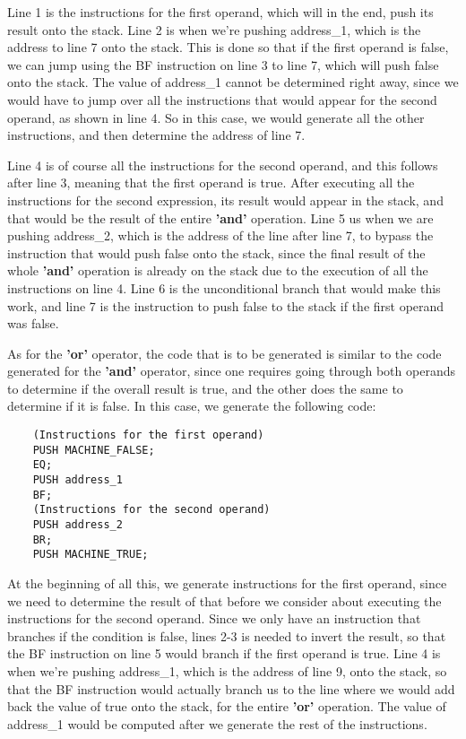 \documentclass{article}
\begin{document}
Line 1 is the instructions for the first operand, which will in the end, push its result onto the stack. Line 2 is when we're pushing address\_1, which is the address to line 7 onto the stack. This is done so that if the first operand is false, we can jump using the BF instruction on line 3 to line 7, which will push false onto the stack. The value of address\_1 cannot be determined right away, since we would have to jump over all the instructions that would appear for the second operand, as shown in line 4. So in this case, we would generate all the other instructions, and then determine the address of line 7.

Line 4 is of course all the instructions for the second operand, and this follows after line 3, meaning that the first operand is true. After executing all the instructions for the second expression, its result would appear in the stack, and that would be the result of the entire \textbf{'and'} operation. Line 5 us when we are pushing address\_2, which is the address of the line after line 7, to bypass the instruction that would push false onto the stack, since the final result of the whole \textbf{'and'} operation is already on the stack due to the execution of all the instructions on line 4. Line 6 is the unconditional branch that would make this work, and line 7 is the instruction to push false to the stack if the first operand was false.

As for the \textbf{'or'} operator, the code that is to be generated is similar to the code generated for the \textbf{'and'} operator, since one requires going through both operands to determine if the overall result is true, and the other does the same to determine if it is false. In this case, we generate the following code:

\begin{lstlisting}
    (Instructions for the first operand)
    PUSH MACHINE_FALSE;
    EQ;
    PUSH address_1
    BF;
    (Instructions for the second operand)
    PUSH address_2
    BR;
    PUSH MACHINE_TRUE;
\end{lstlisting}

At the beginning of all this, we generate instructions for the first operand, since we need to determine the result of that before we consider about executing the instructions for the second operand. Since we only have an instruction that branches if the condition is false, lines 2-3 is needed to invert the result, so that the BF instruction on line 5 would branch if the first operand is true. Line 4 is when we're pushing address\_1, which is the address of line 9, onto the stack, so that the BF instruction would actually branch us to the line where we would add back the value of true onto the stack, for the entire \textbf{'or'} operation. The value of address\_1 would be computed after we generate the rest of the instructions.
\end{document}
